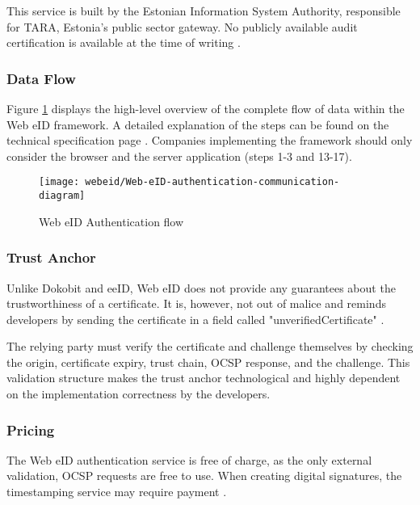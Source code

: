 This service is built by the Estonian Information System Authority, responsible for TARA, Estonia's public sector gateway. No publicly available audit certification is available at the time of writing .

\subsubsection{Data Flow}

Figure \ref{fig:web-eid-authentication} displays the high-level overview of the complete flow of data within the Web eID framework. A detailed explanation of the steps can be found on the technical specification page \cite{ria-webeid-systemarchitecture}. Companies implementing the framework should only consider the browser and the server application (steps 1-3 and 13-17).

\begin{figure}
  \centering
  \texttt{[image: webeid/Web-eID-authentication-communication-diagram]}
  \caption{Web eID Authentication flow \cite{ria-webeid-systemarchitecture}}
  \label{fig:web-eid-authentication}
\end{figure}

\subsubsection{Trust Anchor}

Unlike Dokobit and eeID, Web eID does not provide any guarantees about the trustworthiness of a certificate. It is, however, not out of malice and reminds developers by sending the certificate in a field called "unverifiedCertificate" \cite{ria-webeid-source-web-eid-authtoken-validation-java-readme}.

The relying party must verify the certificate and challenge themselves by checking the origin, certificate expiry, trust chain, OCSP response, and the challenge. This validation structure makes the trust anchor technological and highly dependent on the implementation correctness by the developers.


\subsubsection{Pricing}

The Web eID authentication service is free of charge, as the only external validation, OCSP \cite{rfc6960} requests are free to use. When creating digital signatures, the timestamping service may require payment \cite{ria-webeid-source-web-eid-authtoken-validation-java-readme}.

